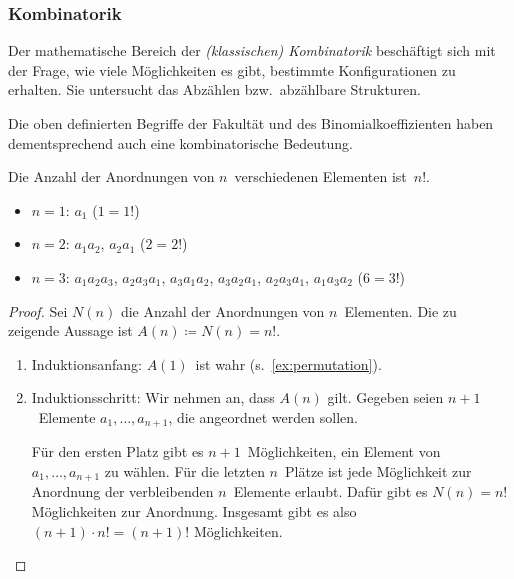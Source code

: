 \documentclass[a4paper]{article}
\begin{document}

\subsubsection{Kombinatorik}

Der mathematische Bereich der \emph{(klassischen) Kombinatorik} beschäftigt sich mit der Frage, wie viele Möglichkeiten es gibt, bestimmte Konfigurationen zu erhalten. Sie untersucht das Abzählen bzw.\ abzählbare Strukturen.

Die oben definierten Begriffe der Fakultät und des Binomialkoeffizienten haben dementsprechend auch eine kombinatorische Bedeutung.

\begin{theorem}[Permutation]
    Die Anzahl der Anordnungen von $n$~verschiedenen Elementen ist~$n!$.
\end{theorem}

\begin{example}\label{ex:permutation}\leavevmode
    \begin{itemize}
        \item $n = 1$: $a_1$ ($1 = 1!$)
        \item $n = 2$: $a_1a_2$, $a_2a_1$ ($2 = 2!$)
        \item $n = 3$: $a_1a_2a_3$, $a_2a_3a_1$, $a_3a_1a_2$, $a_3a_2a_1$, $a_2a_3a_1$, $a_1a_3a_2$ ($6 = 3!$)
    \end{itemize}
\end{example}

\begin{proof}
    Sei $N(n)$ die Anzahl der Anordnungen von $n$~Elementen. Die zu zeigende Aussage ist $A(n) \coloneqq N(n) = n!$.

    \begin{enumerate}
        \item Induktionsanfang: $A(1)$~ist wahr (s.~\cref{ex:permutation}).
        \item Induktionsschritt: Wir nehmen an, dass $A(n)$ gilt. Gegeben seien $n+1$~Elemente $a_1, \dots, a_{n+1}$, die angeordnet werden sollen.

              Für den ersten Platz gibt es $n+1$~Möglichkeiten, ein Element von $a_1, \dots, a_{n+1}$ zu wählen. Für die letzten $n$~Plätze ist jede Möglichkeit zur Anordnung der verbleibenden $n$~Elemente erlaubt. Dafür gibt es $N(n) = n!$ Möglichkeiten zur Anordnung. Insgesamt gibt es also $(n+1) \cdot n! = (n+1)!$ Möglichkeiten.\qedhere
    \end{enumerate}
\end{proof}
\end{document}

